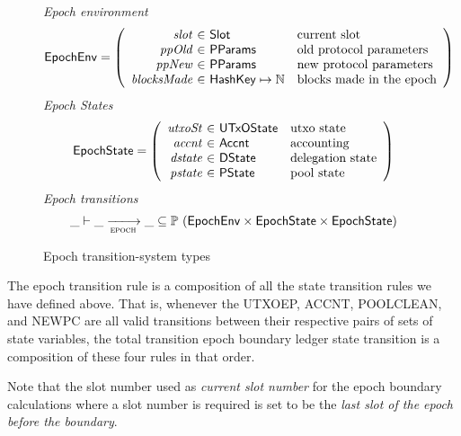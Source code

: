 \begin{figure}[htb]
  \emph{Epoch environment}
  \begin{equation*}
    \EpochEnv =
    \left(
      \begin{array}{r@{~\in~}ll}
        \var{slot} & \Slot & \text{current slot}\\
        \var{ppOld} & \PParams & \text{old protocol parameters}\\
        \var{ppNew} & \PParams & \text{new protocol parameters}\\
        \var{blocksMade} & \HashKey \mapsto \mathbb{N} & \text{blocks made in the epoch}\\
      \end{array}
    \right)
  \end{equation*}
  \emph{Epoch States}
  \begin{equation*}
    \EpochState =
    \left(
      \begin{array}{r@{~\in~}ll}
        \var{utxoSt} & \UTxOState & \text{utxo state}\\
        \var{accnt} & \Accnt & \text{accounting}\\
        \var{dstate} & \DState & \text{delegation state}\\
        \var{pstate} & \PState & \text{pool state}\\
      \end{array}
    \right)
  \end{equation*}
  \emph{Epoch transitions}
  \begin{equation*}
    \_ \vdash
    \var{\_} \trans{epoch}{} \var{\_}
    \subseteq \powerset (\EpochEnv \times \EpochState \times \EpochState)
  \end{equation*}
  \caption{Epoch transition-system types}
  \label{fig:ts-types:epoch}
\end{figure}


The epoch transition rule is a composition of all the state transition rules
we have defined above. That is, whenever the UTXOEP, ACCNT, POOLCLEAN, and
NEWPC are all valid transitions between their respective pairs of sets of
state variables, the total transition epoch boundary ledger state transition
is a composition of these four rules in that order.

Note that the slot number used as \textit{current slot number}
for the epoch boundary calculations where a slot number is required is set to
be the \textit{last slot of the epoch before the boundary}.

